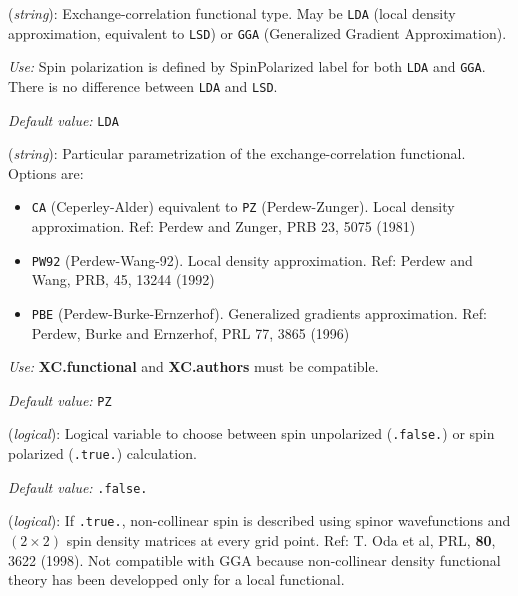 \begin{description}
\itemsep 10pt
\parsep 0pt

\item[{\bf XC.functional}] ({\it string}): 
Exchange-correlation functional type. May be {\tt LDA} 
(local density approximation, equivalent to {\tt LSD}) or 
{\tt GGA} (Generalized Gradient Approximation). 

{\it Use:} Spin polarization is defined by SpinPolarized label for both
{\tt LDA} and {\tt GGA}. There is no difference between {\tt LDA} and {\tt LSD}.

{\it Default value:} {\tt LDA}
        

\item[{\bf XC.authors}] ({\it string}): 
Particular parametrization of the
exchange-correlation functional. Options are:
\begin{itemize}
\item {\tt CA} (Ceperley-Alder) equivalent to {\tt PZ} (Perdew-Zunger).
Local density approximation.
Ref: Perdew and Zunger, PRB 23, 5075 (1981)
\item {\tt PW92} (Perdew-Wang-92). 
Local density approximation.
Ref: Perdew and Wang, PRB, 45, 13244 (1992)
\item {\tt PBE} (Perdew-Burke-Ernzerhof). Generalized gradients approximation.
Ref: Perdew, Burke and Ernzerhof, PRL 77, 3865 (1996)
\end{itemize}

{\it Use:} {\bf XC.functional} and {\bf XC.authors} must be compatible.

{\it Default value:} {\tt PZ}


\item[{\bf SpinPolarized}] ({\it logical}): 
Logical variable to choose between spin unpolarized ({\tt .false.}) 
or spin polarized ({\tt .true.}) calculation.

{\it Default value:} {\tt .false.}


\item[{\bf NonCollinearSpin}] ({\it logical}): 
If {\tt .true.}, non-collinear spin is described using spinor wavefunctions
and $(2 \times 2)$ spin density matrices at every grid point.
Ref: T. Oda et al, PRL, {\bf 80}, 3622 (1998).
Not compatible with GGA because non-collinear density functional
theory has been developped only for a local functional.


\end{description}
